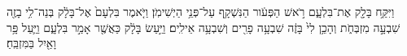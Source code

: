 \documentclass{openreader}
\begin{document}
וַיִּקַּ֥ח בָּלָ֖ק אֶת־בִּלְעָ֑ם רֹ֣אשׁ הַפְּעֹ֔ור הַנִּשְׁקָ֖ף עַל־פְּנֵ֥י הַיְשִׁימֹֽן׃ 
וַיֹּ֤אמֶר בִּלְעָם֙ אֶל־בָּלָ֔ק בְּנֵה־לִ֥י בָזֶ֖ה שִׁבְעָ֣ה מִזְבְּחֹ֑ת וְהָכֵ֥ן לִי֙ בָּזֶ֔ה שִׁבְעָ֥ה פָרִ֖ים וְשִׁבְעָ֥ה אֵילִֽים׃ 
וַיַּ֣עַשׂ בָּלָ֔ק כַּאֲשֶׁ֖ר אָמַ֣ר בִּלְעָ֑ם וַיַּ֛עַל פָּ֥ר וָאַ֖יִל בַּמִּזְבֵּֽחַ׃ 
\end{document}
